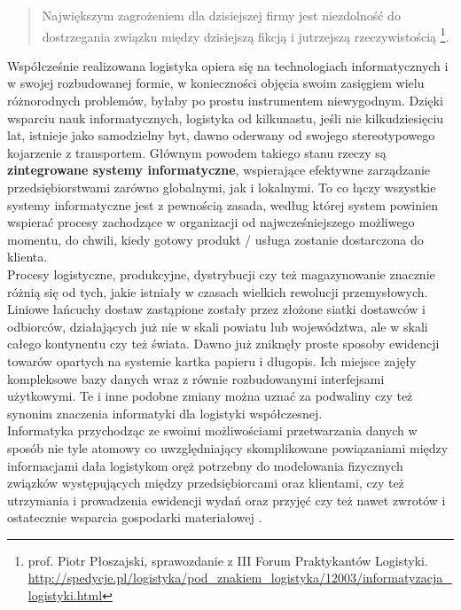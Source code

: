 	\begin{quote}
		Największym zagrożeniem dla dzisiejszej firmy jest niezdolność do dostrzegania związku
		między dzisiejszą fikcją i jutrzejszą rzeczywistością 
		\footnote{prof. Piotr Płoszajski, sprawozdanie z III Forum Praktykantów Logistyki.\\
		\url{http://spedycje.pl/logistyka/pod_znakiem_logistyka/12003/informatyzacja_logistyki.html}}.
	\end{quote}

	Współcześnie realizowana logistyka opiera się na technologiach informatycznych i w swojej rozbudowanej
	formie, w konieczności objęcia swoim zasięgiem wielu różnorodnych problemów, byłaby po prostu instrumentem
	niewygodnym. Dzięki wsparciu nauk informatycznych, logistyka od kilkunastu, jeśli nie kilkudziesięciu lat,
	istnieje jako samodzielny byt, dawno oderwany od swojego stereotypowego kojarzenie z transportem. Głównym
	powodem takiego stanu rzeczy są \textbf{zintegrowane systemy informatyczne}, wspierające efektywne zarządzanie
	przedsiębiorstwami zarówno globalnymi, jak i lokalnymi. To co łączy wszystkie systemy informatyczne jest
	z pewnością zasada, według której system powinien wspierać procesy zachodzące w organizacji od najwcześniejszego
	możliwego momentu, do chwili, kiedy gotowy produkt / usługa zostanie dostarczona do klienta. \\
	
	Procesy logistyczne, produkcyjne, dystrybucji czy też magazynowanie znacznie różnią się od tych, jakie istniały
	w czasach wielkich rewolucji przemysłowych. Liniowe łańcuchy dostaw zastąpione zostały przez złożone siatki dostawców i odbiorców,
	działających już nie w skali powiatu lub województwa, ale w skali całego kontynentu czy też świata. Dawno
	już zniknęły proste sposoby ewidencji towarów opartych na systemie kartka papieru i długopis. Ich miejsce zajęły
	kompleksowe bazy danych wraz z równie rozbudowanymi interfejsami użytkowymi. Te i inne podobne zmiany można
	uznać za podwaliny czy też synonim znaczenia informatyki dla logistyki współczesnej. \\ 
	
	Informatyka przychodząc ze swoimi możliwościami przetwarzania danych w sposób nie tyle atomowy co uwzględniający
	skomplikowane powiązaniami między informacjami dała logistykom oręż potrzebny do modelowania 
	fizycznych związków występujących między przedsiębiorcami oraz klientami, czy też utrzymania i prowadzenia
	ewidencji wydań oraz przyjęć czy też nawet zwrotów i ostatecznie wsparcia gospodarki materiałowej \cite{IDL}.
	
